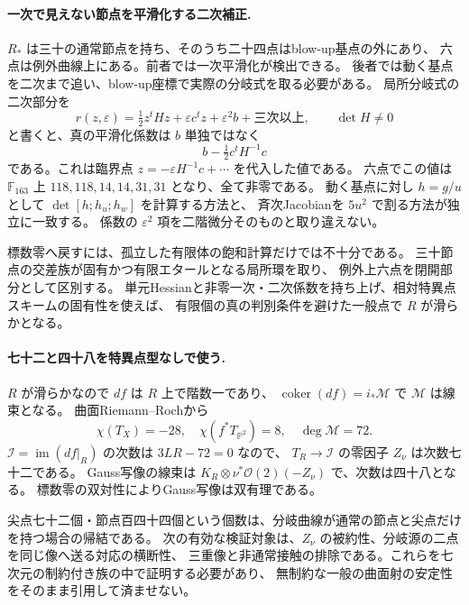 \paragraph{一次で見えない節点を平滑化する二次補正.}
$R_*$ は三十の通常節点を持ち、そのうち二十四点はblow-up基点の外にあり、
六点は例外曲線上にある。前者では一次平滑化が検出できる。
後者では動く基点を二次まで追い、blow-up座標で実際の分岐式を取る必要がある。
局所分岐式の二次部分を
\[
 r(z,\varepsilon)=\tfrac12z^tHz+\varepsilon c^tz+\varepsilon^2b+
 \text{三次以上},\qquad \det H\ne0
\]
と書くと、真の平滑化係数は $b$ 単独ではなく
\[
 b-\tfrac12c^tH^{-1}c
\]
である。これは臨界点 $z=-\varepsilon H^{-1}c+\cdots$ を代入した値である。
六点でこの値は $\mathbb F_{163}$ 上
$118,118,14,14,31,31$ となり、全て非零である。
動く基点に対し $h=g/u$ として $\det[h;h_u;h_w]$ を計算する方法と、
斉次Jacobianを $5u^2$ で割る方法が独立に一致する。
係数の $\varepsilon^2$ 項を二階微分そのものと取り違えない。

標数零へ戻すには、孤立した有限体の飽和計算だけでは不十分である。
三十節点の交差族が固有かつ有限エタールとなる局所環を取り、
例外上六点を閉開部分として区別する。
単元Hessianと非零一次・二次係数を持ち上げ、相対特異点スキームの固有性を使えば、
有限個の真の判別条件を避けた一般点で $R$ が滑らかとなる。

\paragraph{七十二と四十八を特異点型なしで使う.}
$R$ が滑らかなので $df$ は $R$ 上で階数一であり、
$\operatorname{coker}(df)=i_*\mathcal M$ で $\mathcal M$ は線束となる。
曲面Riemann--Rochから
\[
 \chi(T_X)=-28,\quad\chi(f^*T_{\mathbb P^2})=8,
 \quad\deg\mathcal M=72.
\]
$\mathcal I=\operatorname{im}(df|_R)$ の次数は $3LR-72=0$ なので、
$T_R\to\mathcal I$ の零因子 $Z_\nu$ は次数七十二である。
Gauss写像の線束は
$K_R\otimes\nu^*\mathcal O(2)(-Z_\nu)$ で、次数は四十八となる。
標数零の双対性によりGauss写像は双有理である。

尖点七十二個・節点百四十四個という個数は、分岐曲線が通常の節点と尖点だけを持つ場合の帰結である。
次の有効な検証対象は、$Z_\nu$ の被約性、分岐源の二点を同じ像へ送る対応の横断性、
三重像と非通常接触の排除である。これらを七次元の制約付き族の中で証明する必要があり、
無制約な一般の曲面射の安定性をそのまま引用して済ませない。
